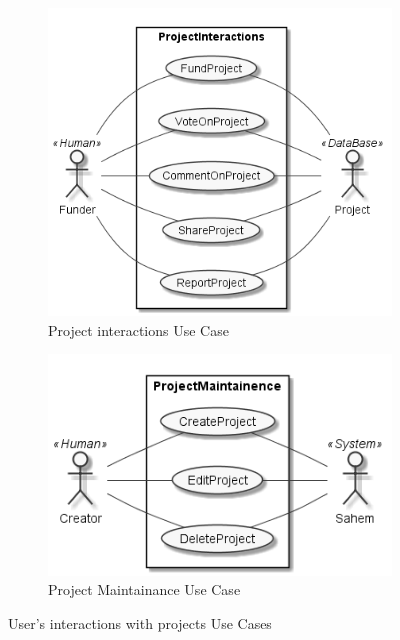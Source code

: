  \begin{figure}
      \centering
      \begin{subfigure}[b]{0.45\textwidth}
          \centering
          \includegraphics[width=\textwidth]{assets/ProjectInteractions.png}
          \caption{Project interactions Use Case}
          \label{fig:project interactions uc}
      \end{subfigure}
      \hfill
      \begin{subfigure}[b]{0.45\textwidth}
          \centering
          \includegraphics[width=\textwidth]{assets/ProjectMaintainence.png}
          \caption{Project Maintainance Use Case}
          \label{fig:project maintainence uc}
      \end{subfigure}
         \caption{User’s interactions with projects Use Cases}
         \label{fig:user with projects ucs}
 \end{figure}

